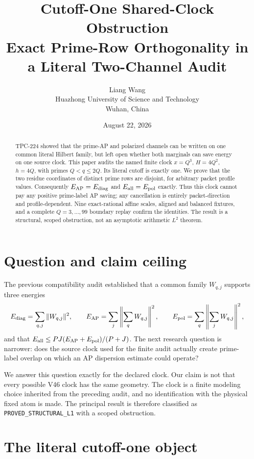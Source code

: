 \documentclass[11pt]{article}
\title{Cutoff-One Shared-Clock Obstruction\\
\large Exact Prime-Row Orthogonality in a Literal Two-Channel Audit}
\author{Liang Wang\\
\small Huazhong University of Science and Technology\\
\small Wuhan, China}
\date{August 22, 2026}
\begin{document}
\maketitle

\begin{abstract}
TPC-224 showed that the prime-AP and polarized channels can be written on one
common literal Hilbert family, but left open whether both marginals can save
energy on one source clock.  This paper audits the named finite clock
\(x=Q^3\), \(H=4Q^2\), \(h=4Q\), with primes \(Q<q\leq 2Q\).  Its literal
cutoff is exactly one.  We prove that the two residue coordinates of distinct
prime rows are disjoint, for arbitrary packet profile values.  Consequently
\(E_{\rm AP}=E_{\rm diag}\) and \(E_{\rm all}=E_{\rm pol}\) exactly.  Thus this
clock cannot pay any positive prime-label AP saving; any cancellation is
entirely packet-direction and profile-dependent.  Nine exact-rational affine
scales, aligned and balanced fixtures, and a complete \(Q=3,\ldots,99\)
boundary replay confirm the identities.  The result is a structural,
scoped obstruction, not an asymptotic arithmetic \(L^2\) theorem.
\end{abstract}

\section{Question and claim ceiling}

The previous compatibility audit \cite{tpc224} established that a common
family \(W_{q,j}\) supports three energies
\begin{equation}
 E_{\rm diag}=\sum_{q,j}\|W_{q,j}\|^2,\qquad
 E_{\rm AP}=\sum_j\left\|\sum_qW_{q,j}\right\|^2,
 \qquad
 E_{\rm pol}=\sum_q\left\|\sum_jW_{q,j}\right\|^2,
 \label{eq:energies}
\end{equation}
and that \(E_{\rm all}\leq PJ(E_{\rm AP}+E_{\rm pol})/(P+J)\).  The next
research question is narrower: does the source clock used for the finite
audit actually create prime-label overlap on which an AP dispersion estimate
could operate?

We answer this question exactly for the declared clock.  Our claim is not
that every possible V46 clock has the same geometry.  The clock is a finite
modeling choice inherited from the preceding audit, and no identification
with the physical fixed atom is made.  The principal result is therefore
classified as \texttt{PROVED\_STRUCTURAL\_L1} with a scoped obstruction.

\section{The literal cutoff-one object}
\end{document}
